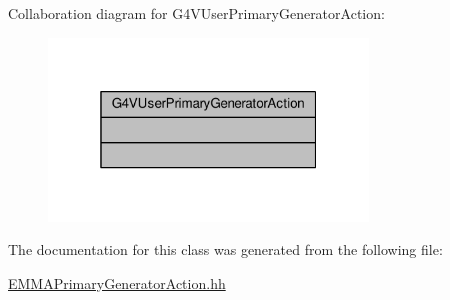 Collaboration diagram for G4\+V\+User\+Primary\+Generator\+Action\+:
\nopagebreak
\begin{figure}[H]
\begin{center}
\leavevmode
\includegraphics[width=241pt]{classG4VUserPrimaryGeneratorAction__coll__graph}
\end{center}
\end{figure}


The documentation for this class was generated from the following file\+:\begin{DoxyCompactItemize}
\item 
\hyperlink{EMMAPrimaryGeneratorAction_8hh}{E\+M\+M\+A\+Primary\+Generator\+Action.\+hh}\end{DoxyCompactItemize}

